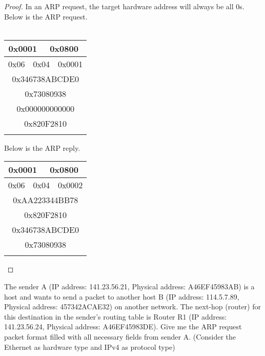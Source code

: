 \documentclass[12pt]{article}
\newenvironment{exercise}[2][Exercise]{\begin{trivlist}
\item[\hskip \labelsep {\bfseries #1}\hskip \labelsep {\bfseries #2.}]}{\end{trivlist}}
\begin{document}
\begin{proof}
In an ARP request, the target hardware address will always be all 0s. Below is the ARP request. \\ \\
\begin{center}
\begin{tabular}{c c c c c c }
     \hline
    \multicolumn{3}{|c}{0x0001} & \multicolumn{3}{|c|}{0x0800} \\
    \hline
    \multicolumn{2}{|c}{0x06} & \multicolumn{2}{|c|}{0x04}  & \multicolumn{2}{c|}{0x0001} \\
     \hline
     \multicolumn{6}{|c|}{0x346738ABCDE0} \\
     \hline 
     \multicolumn{6}{|c|}{0x73080938} \\ 
     \hline 
     \multicolumn{6}{|c|}{0x000000000000} \\
     \hline 
    \multicolumn{6}{|c|}{0x820F2810} \\
    \hline
    \\
\end{tabular}
\end{center}

Below is the ARP reply. 

\begin{center}
\begin{tabular}{c c c c c c }
     \hline
    \multicolumn{3}{|c}{0x0001} & \multicolumn{3}{|c|}{0x0800} \\
    \hline
    \multicolumn{2}{|c}{0x06} & \multicolumn{2}{|c|}{0x04}  & \multicolumn{2}{c|}{0x0002} \\
     \hline
     \multicolumn{6}{|c|}{0xAA223344BB78} \\
     \hline 
     \multicolumn{6}{|c|}{0x820F2810} \\ 
     \hline 
     \multicolumn{6}{|c|}{0x346738ABCDE0} \\
     \hline 
    \multicolumn{6}{|c|}{0x73080938} \\
    \hline
    \\
\end{tabular}
\end{center}

\end{proof}

\begin{exercise}{2}
The sender A (IP address: 141.23.56.21, Physical address: A46EF45983AB) is a host and
wants to send a packet to another host B (IP address: 114.5.7.89, Physical address:
457342ACAE32) on another network. The next-hop (router) for this destination in the
sender's routing table is Router R1 (IP address: 141.23.56.24, Physical address:
A46EF45983DE). Give me the ARP request packet format filled with all necessary fields from sender A. (Consider the Ethernet as hardware type and IPv4 as protocol type)
\end{exercise}
 
\end{document}
